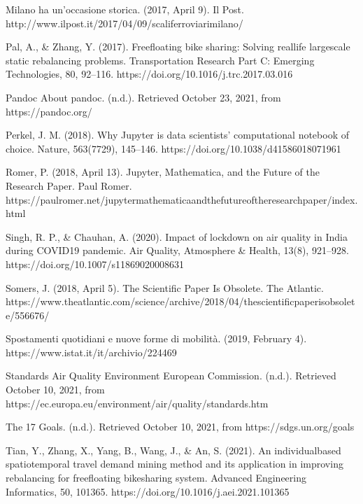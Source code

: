 \documentclass[letterpaper,10pt,english]{jupyterBook}
\begin{document}
\sphinxAtStartPar
Milano ha un’occasione storica. (2017, April 9). Il Post. http://www.ilpost.it/2017/04/09/scali\sphinxhyphen{}ferroviari\sphinxhyphen{}milano/

\sphinxAtStartPar
Pal, A., \& Zhang, Y. (2017). Free\sphinxhyphen{}floating bike sharing: Solving real\sphinxhyphen{}life large\sphinxhyphen{}scale static rebalancing problems. Transportation Research Part C: Emerging Technologies, 80, 92–116. https://doi.org/10.1016/j.trc.2017.03.016

\sphinxAtStartPar
Pandoc \sphinxhyphen{} About pandoc. (n.d.). Retrieved October 23, 2021, from https://pandoc.org/

\sphinxAtStartPar
Perkel, J. M. (2018). Why Jupyter is data scientists’ computational notebook of choice. Nature, 563(7729), 145–146. https://doi.org/10.1038/d41586\sphinxhyphen{}018\sphinxhyphen{}07196\sphinxhyphen{}1

\sphinxAtStartPar
Romer, P. (2018, April 13). Jupyter, Mathematica, and the Future of the Research Paper. Paul Romer. https://paulromer.net/jupyter\sphinxhyphen{}mathematica\sphinxhyphen{}and\sphinxhyphen{}the\sphinxhyphen{}future\sphinxhyphen{}of\sphinxhyphen{}the\sphinxhyphen{}research\sphinxhyphen{}paper/index.html

\sphinxAtStartPar
Singh, R. P., \& Chauhan, A. (2020). Impact of lockdown on air quality in India during COVID\sphinxhyphen{}19 pandemic. Air Quality, Atmosphere \& Health, 13(8), 921–928. https://doi.org/10.1007/s11869\sphinxhyphen{}020\sphinxhyphen{}00863\sphinxhyphen{}1

\sphinxAtStartPar
Somers, J. (2018, April 5). The Scientific Paper Is Obsolete. The Atlantic. https://www.theatlantic.com/science/archive/2018/04/the\sphinxhyphen{}scientific\sphinxhyphen{}paper\sphinxhyphen{}is\sphinxhyphen{}obsolete/556676/

\sphinxAtStartPar
Spostamenti quotidiani e nuove forme di mobilità. (2019, February 4). https://www.istat.it/it/archivio/224469

\sphinxAtStartPar
Standards \sphinxhyphen{} Air Quality \sphinxhyphen{} Environment \sphinxhyphen{} European Commission. (n.d.). Retrieved October 10, 2021, from https://ec.europa.eu/environment/air/quality/standards.htm

\sphinxAtStartPar
The 17 Goals. (n.d.). Retrieved October 10, 2021, from https://sdgs.un.org/goals

\sphinxAtStartPar
Tian, Y., Zhang, X., Yang, B., Wang, J., \& An, S. (2021). An individual\sphinxhyphen{}based spatio\sphinxhyphen{}temporal travel demand mining method and its application in improving rebalancing for free\sphinxhyphen{}floating bike\sphinxhyphen{}sharing system. Advanced Engineering Informatics, 50, 101365. https://doi.org/10.1016/j.aei.2021.101365
\end{document}
